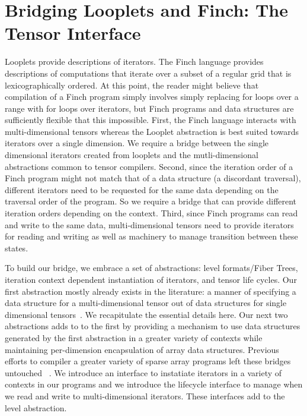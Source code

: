 \section{Bridging Looplets and Finch: The Tensor Interface}
Looplets provide descriptions of iterators. 
%
The Finch language provides descriptions of computations that iterate over a subset of a regular grid that is lexicographically ordered.
%
At this point, the reader might believe that compilation of a Finch program simply involves simply replacing for loops over a range with for loops over iterators, but Finch programs and data structures are sufficiently flexible that this impossible.
%
First, the Finch language interacts with multi-dimensional tensors whereas the Looplet abstraction is best suited towards iterators over a single dimension.
%
We require a bridge between the single dimensional iterators created from looplets and the mutli-dimensional abstractions common to tensor compilers.
%
Second, since the iteration order of a Finch program might not match that of a data structure (a discordant traversal), different iterators need to be requested for the same data depending on the traversal order of the program.
%
So we require a bridge that can provide different iteration orders depending on the context.
%
Third, since Finch programs can read and write to the same data, multi-dimensional tensors need to provide iterators for reading and writing as well as machinery to manage transition between these states.

To build our bridge, we embrace a set of abstractions: level formats/Fiber Trees, iteration context dependent instantiation of iterators, and tensor life cycles.
%
Our first abstraction mostly already exists in the literature: a manner of specifying a data structure for a multi-dimensional tensor out of data structures for single dimensional tensors~\cite{sze2017efficient,chou2022compilation, chou2018format}. 
%
We recapitulate the essential details here.
%
Our next two abstractions adds to to the first by providing a mechanism to use data structures generated by the first abstraction in a greater variety of contexts while maintaining per-dimension encapsulation of array data structures.
%
Previous efforts to compiler a greater variety of sparse array programs left these bridges untouched ~\cite{henry_compilation_2021, won2023unified, senanayake2020sparse}.
%
We introduce an interface to instatiate iterators in a variety of contexts in our programs and we introduce the lifecycle interface to manage when we read and write to multi-dimensional iterators.
%
These interfaces add to the level abstraction.


